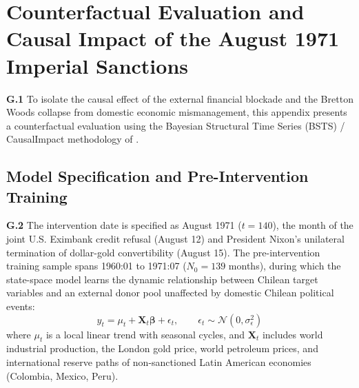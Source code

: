 \section{Counterfactual Evaluation and Causal Impact of the August 1971 Imperial Sanctions}
\label{app:causal_impact}

\textbf{G.1} To isolate the causal effect of the external financial blockade and the Bretton Woods collapse from domestic economic mismanagement, this appendix presents a counterfactual evaluation using the Bayesian Structural Time Series (BSTS) / CausalImpact methodology of \citet{Brodersen2015}.

\subsection{Model Specification and Pre-Intervention Training}
\label{app:bsts_specification}

\textbf{G.2} The intervention date is specified as August 1971 ($t=140$), the month of the joint U.S. Eximbank credit refusal (August 12) and President Nixon's unilateral termination of dollar-gold convertibility (August 15). The pre-intervention training sample spans 1960:01 to 1971:07 ($N_0 = 139$ months), during which the state-space model learns the dynamic relationship between Chilean target variables and an external donor pool unaffected by domestic Chilean political events:
\begin{equation}
	y_t = \mu_t + \mathbf{X}_t \bm{\beta} + \epsilon_t, \qquad \epsilon_t \sim \mathcal{N}(0, \sigma_\epsilon^2)
\end{equation}
where $\mu_t$ is a local linear trend with seasonal cycles, and $\mathbf{X}_t$ includes world industrial production, the London gold price, world petroleum prices, and international reserve paths of non-sanctioned Latin American economies (Colombia, Mexico, Peru).


